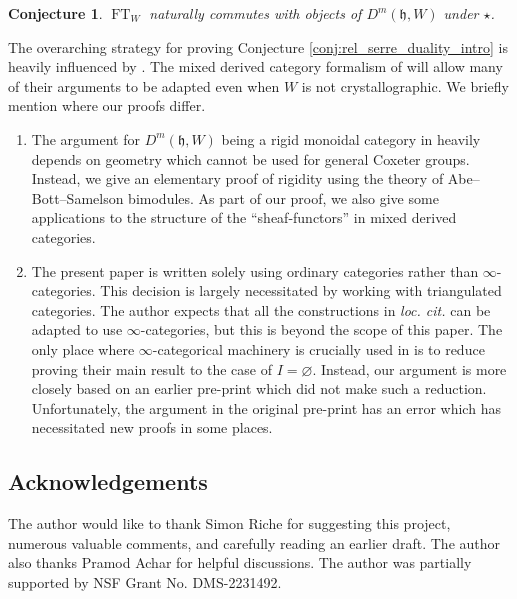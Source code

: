 \documentclass{amsart}
\newcommand{\BE}{D^m}
\newcommand{\fr}[1]{\mathfrak{#1}}
\renewcommand{\emptyset}{\varnothing}
\newtheorem{conjecture}{Conjecture}[section]
\theoremstyle{definition}
\DeclareMathOperator{\FT}{FT}
\begin{document}
        \begin{conjecture}\label{conj:ft_commutes}
                $\FT_W$ naturally commutes with objects of $\BE (\fr{h}, W)$ under $\star$.
        \end{conjecture}

        The overarching strategy for proving Conjecture \ref{conj:rel_serre_duality_intro} is heavily influenced by \cite{HLnew}.
        The mixed derived category formalism of \cite{ARV} will allow many of their arguments to be adapted even when $W$ is not crystallographic.
        We briefly mention where our proofs differ.
        
        \begin{enumerate}
                \item The argument for $\BE (\fr{h}, W)$ being a rigid monoidal category in \cite{HLnew} heavily depends on geometry which cannot be used for general Coxeter groups.
                Instead, we give an elementary proof of rigidity using the theory of Abe--Bott--Samelson bimodules. 
                As part of our proof, we also give some applications to the structure of the ``sheaf-functors'' in mixed derived categories. 
                \item The present paper is written solely using ordinary categories rather than $\infty$-categories. 
                This decision is largely necessitated by \cite{ARV} working with triangulated categories.
                The author expects that all the constructions in \emph{loc. cit.} can be adapted to use $\infty$-categories, but this is beyond the scope of this paper.
                The only place where $\infty$-categorical machinery is crucially used in \cite{HLnew} is to reduce proving their main result to the case of $I = \emptyset$.
                Instead, our argument is more closely based on an earlier pre-print \cite{HLold} which did not make such a reduction.
                Unfortunately, the argument in the original pre-print has an error which has necessitated new proofs in some places.
        \end{enumerate}

        \subsection{Acknowledgements}
        The author would like to thank Simon Riche for suggesting this project, numerous valuable comments, and carefully reading an earlier draft. The author also thanks Pramod Achar for helpful discussions.
        The author was partially supported by NSF Grant No. DMS-2231492.
\end{document}

